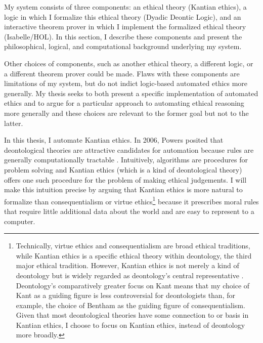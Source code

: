 %
\begin{isabellebody}%
%
%
\isadelimtheory
%
\endisadelimtheory
%
\isatagtheory
%
\endisatagtheory
{\isafoldtheory}%
%
\isadelimtheory
%
\endisadelimtheory
%
\isadelimdocument
%
\endisadelimdocument
%
\isatagdocument
%
\isamarkuptrue%
%
\endisatagdocument
{\isafolddocument}%
%
\isadelimdocument
%
\endisadelimdocument
%
\begin{isamarkuptext}%
My system consists of three components: an ethical theory (Kantian ethics), a logic in which
I formalize this ethical theory (Dyadic Deontic Logic), and an interactive theorem prover in which I 
implement the formalized ethical theory (Isabelle/HOL). In this section, I describe these components and 
present the philosophical, logical, and computational background underlying my system. 

Other choices of components, such as another ethical theory, a different logic, or a different theorem 
prover could be made. Flaws with these components are limitations of my system, but do not 
indict logic-based automated ethics more generally. My thesis seeks to 
both present a specific implementation of automated ethics and to argue for a particular approach 
to automating ethical reasoning more generally and these choices are relevant to the former goal but 
not to the latter.%
\end{isamarkuptext}\isamarkuptrue%
%
\isadelimdocument
%
\endisadelimdocument
%
\isatagdocument
%
\isamarkuptrue%
%
\endisatagdocument
{\isafolddocument}%
%
\isadelimdocument
%
\endisadelimdocument
%
\begin{isamarkuptext}%
In this thesis, I automate Kantian ethics. In 2006, Powers posited that deontological theories are 
attractive candidates for automation because rules are generally computationally tractable \cite[1]{powers}. 
Intuitively, algorithms are procedures for problem solving and Kantian ethics (which is a kind 
of deontological theory) offers one such 
procedure for the problem of making ethical judgements. I will make this intuition precise by
arguing that Kantian ethics is more natural to formalize than consequentialism or virtue ethics\footnote{Technically, virtue ethics and
consequentialism are broad ethical traditions, while Kantian ethics is a specific ethical theory within
deontology, the third major ethical tradition. However, Kantian ethics is not merely a kind of deontology
but is widely regarded as deontology's central representative \citep{sepdeont}. Deontology's comparatively 
greater focus on Kant means that my choice of Kant as a guiding figure is less controversial for deontologists 
than, for example, the choice of Bentham as the guiding figure of consequentialism. Given that most deontological
theories have some connection to or basis in Kantian ethics, I choose to focus on Kantian ethics, instead
of deontology more broadly. } because it prescribes moral rules that require 
little additional data about the world and are easy to represent to a computer.


\end{isamarkuptext}
\end{isabellebody}
